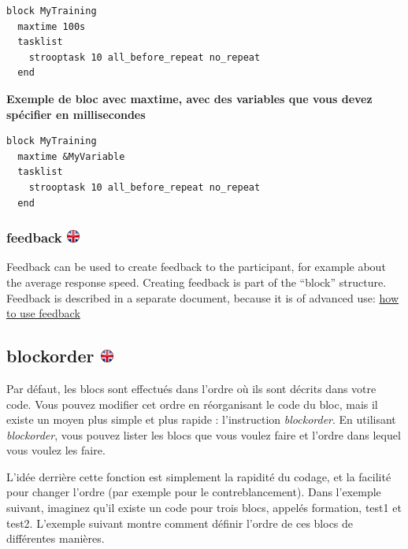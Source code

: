 \documentclass[
]{book}
\begin{document}
\begin{verbatim}
block MyTraining
  maxtime 100s
  tasklist
    strooptask 10 all_before_repeat no_repeat
  end
\end{verbatim}

\textbf{Exemple de bloc avec maxtime, avec des variables que vous devez spécifier en millisecondes}

\begin{verbatim}
block MyTraining
  maxtime &MyVariable
  tasklist
    strooptask 10 all_before_repeat no_repeat
  end
\end{verbatim}

\hypertarget{feedback}{%
\subsubsection[feedback ]{\texorpdfstring{feedback \href{https://www.psytoolkit.org/doc3.2.0/syntax.html\#block-feedback}{\protect\includegraphics{img/ukflag.png}}}{feedback }}\label{feedback}}

Feedback can be used to create feedback to the participant, for example about the average response speed. Creating feedback is part of the ``block'' structure. Feedback is described in a separate document, because it is of advanced use: \href{https://www.psytoolkit.org/doc3.1.0/feedback.html}{how to use feedback}

\hypertarget{blockorder}{%
\subsection[blockorder ]{\texorpdfstring{blockorder \href{https://www.psytoolkit.org/doc3.2.0/syntax.html\#blockorder}{\protect\includegraphics{img/ukflag.png}}}{blockorder }}\label{blockorder}}

Par défaut, les blocs sont effectués dans l'ordre où ils sont décrits dans votre code. Vous pouvez modifier cet ordre en réorganisant le code du bloc, mais il existe un moyen plus simple et plus rapide : l'instruction \emph{blockorder}. En utilisant \emph{blockorder}, vous pouvez lister les blocs que vous voulez faire et l'ordre dans lequel vous voulez les faire.

L'idée derrière cette fonction est simplement la rapidité du codage, et la facilité pour changer l'ordre (par exemple pour le contreblancement). Dans l'exemple suivant, imaginez qu'il existe un code pour trois blocs, appelés formation, test1 et test2. L'exemple suivant montre comment définir l'ordre de ces blocs de différentes manières.
\end{document}
